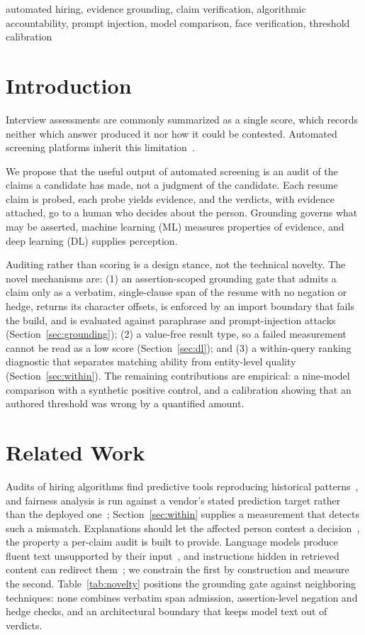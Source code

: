 \documentclass[conference,a4paper]{IEEEtran}
\begin{document}
\begin{IEEEkeywords}
automated hiring, evidence grounding, claim verification, algorithmic
accountability, prompt injection, model comparison, face verification,
threshold calibration
\end{IEEEkeywords}

\section{Introduction}
Interview assessments are commonly summarized as a single score, which records
neither which answer produced it nor how it could be contested. Automated
screening platforms inherit this limitation~\cite{bogen2018,raghavan2020}.

We propose that the useful output of automated screening is an
audit of the claims a candidate has made, not a judgment of the candidate. Each
resume claim is probed, each probe yields evidence, and the verdicts, with
evidence attached, go to a human who decides about the person. Grounding
governs what may be asserted, machine learning (ML) measures properties of
evidence, and deep learning (DL) supplies perception.

Auditing rather than scoring is a design stance, not the technical novelty.
The novel mechanisms are: (1) an assertion-scoped grounding gate that admits a
claim only as a verbatim, single-clause span of the resume with no negation or
hedge, returns its character offsets, is enforced by an import boundary that
fails the build, and is evaluated against paraphrase and prompt-injection
attacks (Section~\ref{sec:grounding}); (2) a value-free result type, so a
failed measurement cannot be read as a low score (Section~\ref{sec:dl}); and
(3) a within-query ranking diagnostic that separates matching ability from
entity-level quality (Section~\ref{sec:within}). The remaining contributions
are empirical: a nine-model comparison with a synthetic positive control, and a
calibration showing that an authored threshold was wrong by a quantified
amount.

\section{Related Work}
Audits of hiring algorithms find predictive tools reproducing historical
patterns~\cite{bogen2018}, and fairness analysis is run against a vendor's
stated prediction target rather than the deployed one~\cite{raghavan2020};
Section~\ref{sec:within} supplies a measurement that detects such a mismatch.
Explanations should let the affected person contest a decision~\cite{wachter2018},
the property a per-claim audit is built to provide. Language models produce
fluent text unsupported by their input~\cite{ji2023}, and instructions hidden in
retrieved content can redirect them~\cite{greshake2023}; we constrain the
first by construction and measure the second. Table~\ref{tab:novelty}
positions the grounding gate against neighboring techniques: none combines
verbatim span admission, assertion-level negation and hedge checks, and an
architectural boundary that keeps model text out of verdicts.
\end{document}
